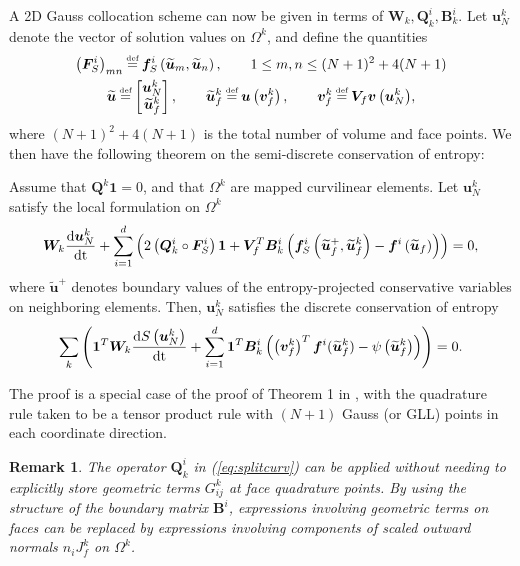 \documentclass[review,onefignum,onetabnum,final]{siamart171218}
\newtheorem*{remark}{Remark}
\renewcommand{\tilde}{\widetilde}
\newcommand{\td}[2]{\frac{{\rm d}#1}{{\rm d}{\rm #2}}}
\newcommand{\LRp}[1]{\left( #1 \right)}
\newcommand\myeq{\mathrel{\stackrel{\makebox[0pt]{\mbox{\normalfont\tiny def}}}{=}}}
\begin{document}
A 2D Gauss collocation scheme can now be given in terms of $\bm{W}_k, \bm{Q}^i_k, \bm{B}^i_k$.   Let $\bm{u}^k_N$ denote the vector of solution values on $\Omega^k$, and define the quantities 
\begin{gather*}
\LRp{\bm{F}^i_S}_{mn} \myeq \bm{f}^i_S\LRp{\tilde{\bm{u}}_m,\tilde{\bm{u}}_n}, \qquad 1 \leq m,n \leq (N+1)^2 + 4(N+1) \\
\tilde{\bm{u}} \myeq \begin{bmatrix}
\bm{u}^k_N\\
\tilde{\bm{u}}^k_f
\end{bmatrix}, \qquad \tilde{\bm{u}}^k_f \myeq \bm{u}\LRp{\bm{v}^k_f}, \qquad 
\bm{v}^k_f \myeq {\bm{V}_f\bm{v}\LRp{\bm{u}^k_N}},
\end{gather*}
where $(N+1)^2 + 4(N+1)$ is the total number of volume and face points.  
We then have the following theorem on the semi-discrete conservation of entropy:
\begin{theorem}
\label{thm:esdg2d}
Assume that $\bm{Q}^k\bm{1} = 0$, and that $\Omega^k$ are mapped curvilinear elements.  Let $\bm{u}^k_N$ satisfy the local formulation on $\Omega^k$
\begin{equation}
{\bm{W}_k\td{\bm{u}^k_N}{t} + \sum_{i=1}^d \LRp{2\LRp{\bm{Q}^i_k\circ\bm{F}^i_S}\bm{1} + \bm{V}_f^T\bm{B}_k^i\LRp{\bm{f}^i_S\LRp{{\tilde{\bm{u}}_f}^+,\tilde{\bm{u}}^k_f}-\bm{f}^i\LRp{\tilde{\bm{u}}_f}}}} = 0, 
\end{equation}
where $\tilde{\bm{u}}^+$ denotes boundary values of the entropy-projected conservative variables on neighboring elements.  Then, $\bm{u}^k_N$ satisfies the discrete conservation of entropy 
\[
\sum_{k} \LRp{\bm{1}^T\bm{W}_k\td{S\LRp{\bm{u}^k_N}}{t} + \sum_{i=1}^d\bm{1}^T\bm{B}^i_k\LRp{\LRp{\bm{v}^k_f}^T\bm{f}^i(\tilde{\bm{u}}^k_f) - \psi\LRp{\tilde{\bm{u}}^k_f}}} = 0.
\]
\end{theorem}
The proof is a special case of the proof of Theorem 1 in \cite{chan2018discretely}, with the quadrature rule taken to be a tensor product rule with $(N+1)$ Gauss (or GLL) points in each coordinate direction.  

\begin{remark}
The operator $\bm{Q}^i_k$  in (\ref{eq:splitcurv}) can be applied without needing to explicitly store geometric terms $G^k_{ij}$ at face quadrature points.  By using the structure of the boundary matrix $\bm{B}^i$, expressions involving geometric terms on faces can be replaced by expressions involving components of scaled outward normals ${n}_i J^k_f$ on $\Omega^k$.  
\end{remark}
\end{document}
